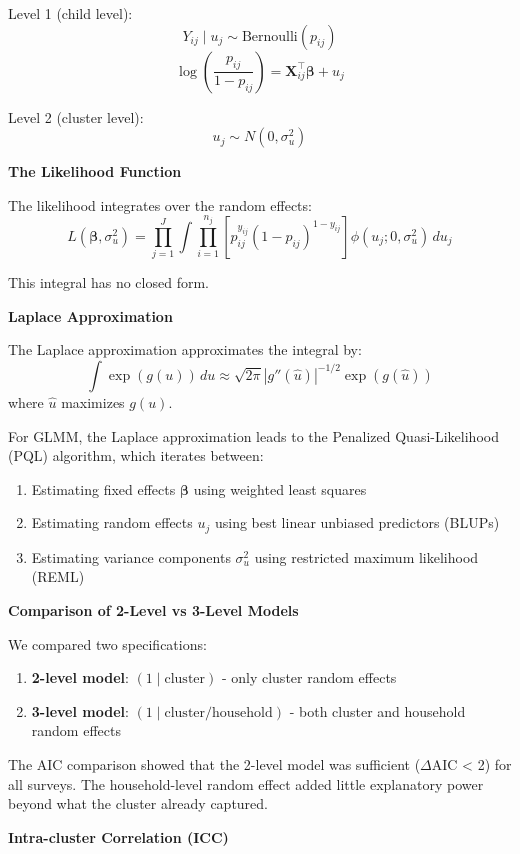 Level 1 (child level):
\[
Y_{ij} \mid u_j \sim \text{Bernoulli}(p_{ij})
\]
\[
\log\left(\frac{p_{ij}}{1-p_{ij}}\right) = \mathbf{X}_{ij}^\top \boldsymbol{\beta} + u_j
\]

Level 2 (cluster level):
\[
u_j \sim N(0, \sigma_u^2)
\]

\textbf{The Likelihood Function}

The likelihood integrates over the random effects:
\[
L(\boldsymbol{\beta}, \sigma_u^2) = \prod_{j=1}^J \int \prod_{i=1}^{n_j} \left[ p_{ij}^{y_{ij}} (1-p_{ij})^{1-y_{ij}} \right] \phi(u_j; 0, \sigma_u^2) \, du_j
\]

This integral has no closed form.

\textbf{Laplace Approximation}

The Laplace approximation approximates the integral by:
\[
\int \exp(g(u)) \, du \approx \sqrt{2\pi} |g''(\hat{u})|^{-1/2} \exp(g(\hat{u}))
\]
where $\hat{u}$ maximizes $g(u)$.

For GLMM, the Laplace approximation leads to the Penalized Quasi-Likelihood (PQL) algorithm, which iterates between:

\begin{enumerate}
	\item Estimating fixed effects $\boldsymbol{\beta}$ using weighted least squares
	\item Estimating random effects $u_j$ using best linear unbiased predictors (BLUPs)
	\item Estimating variance components $\sigma_u^2$ using restricted maximum likelihood (REML)
\end{enumerate}

\textbf{Comparison of 2-Level vs 3-Level Models}

We compared two specifications:

\begin{enumerate}
	\item \textbf{2-level model}: $(1 \mid \text{cluster})$ - only cluster random effects
	\item \textbf{3-level model}: $(1 \mid \text{cluster/household})$ - both cluster and household random effects
\end{enumerate}

The AIC comparison showed that the 2-level model was sufficient ($\Delta$AIC < 2) for all surveys. The household-level random effect added little explanatory power beyond what the cluster already captured.

\textbf{Intra-cluster Correlation (ICC)}

